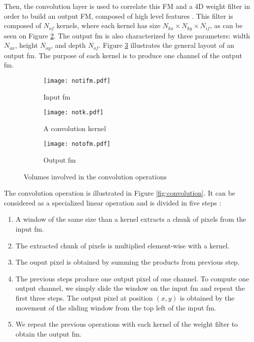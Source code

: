 Then, the convolution layer is used to correlate this FM and a 4D weight filter in order to build an output FM, composed of high level features \cite{zhao_towards_2018}.
This filter is composed of $N_{of}$ kernels, where each kernel has size $N_{kx} \times N_{ky} \times N_{if}$, as can be seen on Figure \ref{fig:notation:k}. The output \acrshort{fm} is also characterized by three parameters: width $N_{ox}$, height $N_{oy}$, and depth $N_{of}$. Figure \ref{fig:notation:ofm} illustrates the general layout of an output \acrshort{fm}. The purpose of each kernel is to produce one channel of the output \acrshort{fm}.
%
\begin{figure}[H]
    \centering
    \begin{subfigure}[t]{.32\textwidth}
    \centering
    \texttt{[image: notifm.pdf]}
    \caption{Input \acrshort{fm}}
    \label{fig:notation:ifm}
    \end{subfigure}
    \begin{subfigure}[t]{.32\textwidth}
    \centering
    \texttt{[image: notk.pdf]}
    \caption{A convolution kernel}
    \label{fig:notation:k}
    \end{subfigure}
    \begin{subfigure}[t]{.32\textwidth}
    \centering
    \texttt{[image: notofm.pdf]}
    \caption{Output \acrshort{fm}}
    \label{fig:notation:ofm}
    \end{subfigure}
    \caption{Volumes involved in the convolution operations}
    \label{fig:notconv}
\end{figure}
%
The convolution operation is illustrated in Figure \ref{fig:convolution}. It can be considered as a specialized linear operation and is divided in five steps \cite{matteucci_artificial_2019, zhu_efficient_2020}:
%
\begin{enumerate}
    \item A window of the same size than a kernel extracts a chunk of pixels from the input \acrshort{fm}.
    \item The extracted chunk of pixels is multiplied element-wise with a kernel.
    \item The ouput pixel is obtained by summing the products from previous step.
    \item The previous steps produce one output pixel of one channel. To compute one output channel, we simply slide the window on the input \acrshort{fm} and repeat the first three steps. The output pixel at position $(x, y)$ is obtained by the movement of the sliding window from the top left of the input \acrshort{fm}. 
    \item We repeat the previous operations with each kernel of the weight filter to obtain the output \acrshort{fm}.
\end{enumerate}
